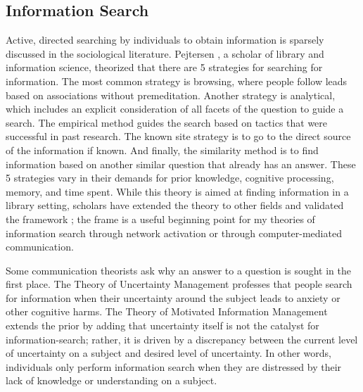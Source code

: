 \hypertarget{information-search}{%
\subsection{Information Search}\label{information-search}}

Active, directed searching by individuals to obtain information is sparsely
discussed in the sociological literature. Pejtersen \citet{pejtersen1984}, a scholar
of library and information science, theorized that there are 5 strategies for
searching for information. The most common strategy is browsing, where people
follow leads based on associations without premeditation. Another strategy is
analytical, which includes an explicit consideration of all facets of the
question to guide a search. The empirical method guides the search based on
tactics that were successful in past research. The known site strategy is to go
to the direct source of the information if known. And finally, the similarity
method is to find information based on another similar question that already has
an answer. These 5 strategies vary in their demands for prior knowledge,
cognitive processing, memory, and time spent. While this theory is aimed at
finding information in a library setting, scholars have extended the theory to
other fields and validated the framework
\citep{fidelHumanInformationInteraction2012}; the frame is a useful beginning point
for my theories of information search through network activation or through
computer-mediated communication.

Some communication theorists ask why an answer to a question is sought in the
first place. The Theory of Uncertainty Management
\citep{brashersCommunicationUncertaintyManagement2001} professes that people search
for information when their uncertainty around the subject leads to anxiety or
other cognitive harms. The Theory of Motivated Information Management
\citep{afifiTheoryMotivatedInformation2004, afifiSeekingInformationSexual2006}
extends the prior by adding that uncertainty itself is not the catalyst for
information-search; rather, it is driven by a discrepancy between the current
level of uncertainty on a subject and desired level of uncertainty. In other
words, individuals only perform information search when they are distressed by
their lack of knowledge or understanding on a subject.


